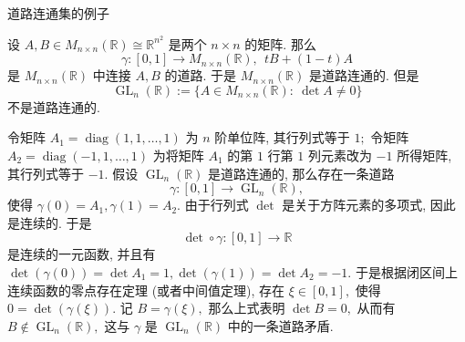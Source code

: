
\begin{frame}{道路连通集的例子}

设 $A, B \in M_{n\times n}(\mathbb{R}) \cong \mathbb{R}^{n^2}$ 是两个 $n\times n$ 的矩阵. 那么
\[\gamma: [0, 1] \longrightarrow M_{n\times n}(\mathbb{R}), ~~ tB + (1-t)A\]
是 $M_{n\times n}(\mathbb{R})$ 中连接 $A, B$ 的道路. 于是 $M_{n\times n}(\mathbb{R})$ 是道路连通的.
\pause
但是
\[\operatorname{GL}_n(\mathbb{R}) := \{A \in M_{n\times n}(\mathbb{R}): ~ \det A \neq 0\}\]
\alert{不是道路连通的.}

\pause
\vspace{1em}

\startproof[bg=yellow, fg=red]
令矩阵 $A_1 = \operatorname{diag}(1, 1, \dots, 1)$ 为 $n$ 阶单位阵, 其行列式等于 $1;$ 令矩阵 $A_2 = \operatorname{diag}(-1, 1, \dots, 1)$ 为将矩阵 $A_1$ 的第 $1$ 行第 $1$ 列元素改为 $-1$ 所得矩阵, 其行列式等于 $-1.$ 假设 $\operatorname{GL}_n(\mathbb{R})$ 是道路连通的, 那么存在一条道路
\[\gamma: [0, 1] \longrightarrow \operatorname{GL}_n(\mathbb{R}),\]
使得 $\gamma(0) = A_1, \gamma(1) = A_2.$
\pause
由于\alert{行列式 $\det$ 是关于方阵元素的多项式, 因此是连续的}. 于是
\[\det\circ\gamma: [0, 1] \longrightarrow \mathbb{R}\]
是连续的一元函数, 并且有 $\det(\gamma(0)) = \det A_1 = 1, \det(\gamma(1)) = \det A_2 = -1.$
\pause
于是根据闭区间上连续函数的零点存在定理 (或者中间值定理), 存在 $\xi \in [0, 1],$ 使得 $0 = \det(\gamma(\xi)).$ 记 $B = \gamma(\xi),$ 那么上式表明 $\det B = 0,$ 从而有 $B \not\in \operatorname{GL}_n(\mathbb{R}),$ 这与 $\gamma$ 是 $\operatorname{GL}_n(\mathbb{R})$ 中的一条道路矛盾.

\end{frame}


